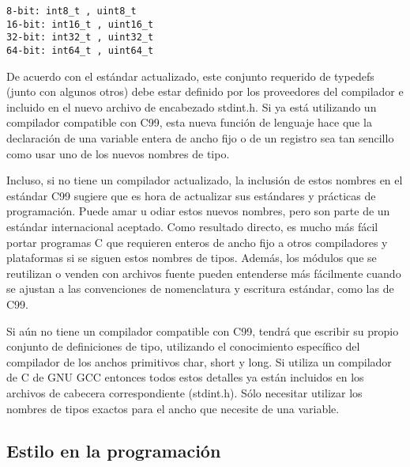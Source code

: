 \documentclass[output=paper, 
colorlinks,
citecolor=brown,
newtxmath
]{langscibook}
\begin{document}
\begin{small}
\begin{verbatim}
8-bit: int8_t , uint8_t
16-bit: int16_t , uint16_t
32-bit: int32_t , uint32_t
64-bit: int64_t , uint64_t
\end{verbatim}
\end{small}




De acuerdo con el estándar actualizado, este conjunto requerido de 
typedefs (junto con algunos otros) debe estar definido por los 
proveedores del compilador e incluido en el nuevo archivo 
de encabezado stdint.h. Si ya está utilizando un compilador 
compatible con C99, esta nueva función de lenguaje hace 
que la declaración de una variable entera de ancho fijo o de un registro 
sea tan sencillo como usar uno de los nuevos nombres de tipo.

Incluso, si no tiene un compilador actualizado, 
la inclusión de estos nombres en el estándar C99 sugiere 
que es hora de actualizar sus estándares y prácticas de programación. 
Puede amar u odiar estos nuevos nombres, pero son parte de un estándar 
internacional aceptado. Como resultado directo, es mucho más fácil 
portar programas C que requieren enteros de ancho fijo a otros compiladores 
y plataformas si se siguen estos nombres de tipos.
Además, los módulos que se reutilizan o venden con archivos fuente 
pueden entenderse más fácilmente cuando se ajustan 
a las convenciones de nomenclatura y escritura estándar, como las de C99.

Si aún no tiene un compilador compatible con C99, 
tendrá que escribir su propio conjunto de definiciones de tipo, 
utilizando el conocimiento específico del compilador 
de los anchos primitivos char, short y long. 
Si utiliza un compilador de C de GNU GCC entonces todos estos
detalles ya están incluidos en los archivos de cabecera correspondiente (stdint.h).
Sólo necesitar utilizar los nombres de tipos exactos para el ancho que
necesite de una variable.


\subsection {Estilo en la programación}
\end{document}
